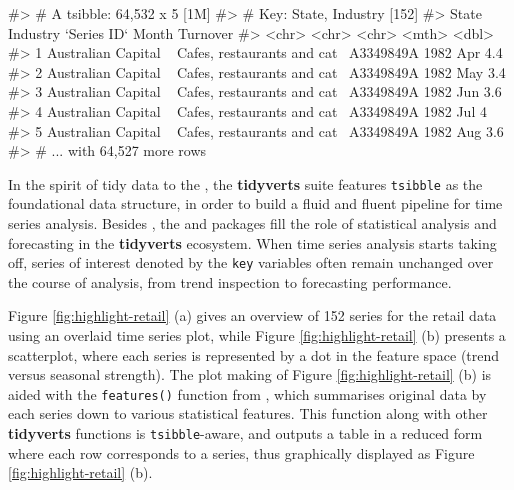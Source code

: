 \begin{Schunk}
\begin{Soutput}
#> # A tsibble: 64,532 x 5 [1M]
#> # Key:       State, Industry [152]
#>   State                Industry                    `Series ID`    Month Turnover
#>   <chr>                <chr>                       <chr>          <mth>    <dbl>
#> 1 Australian Capital ~ Cafes, restaurants and cat~ A3349849A   1982 Apr      4.4
#> 2 Australian Capital ~ Cafes, restaurants and cat~ A3349849A   1982 May      3.4
#> 3 Australian Capital ~ Cafes, restaurants and cat~ A3349849A   1982 Jun      3.6
#> 4 Australian Capital ~ Cafes, restaurants and cat~ A3349849A   1982 Jul      4  
#> 5 Australian Capital ~ Cafes, restaurants and cat~ A3349849A   1982 Aug      3.6
#> # ... with 64,527 more rows
\end{Soutput}
\end{Schunk}

In the spirit of tidy data to the 
\citep{Wickham2019}, the \textbf{tidyverts} suite features
\texttt{tsibble} as the foundational data structure, in order to build a
fluid and fluent pipeline for time series analysis. Besides
, the  and  packages
fill the role of statistical analysis and forecasting in the
\textbf{tidyverts} ecosystem. When time series analysis starts taking
off, series of interest denoted by the \texttt{key} variables often
remain unchanged over the course of analysis, from trend inspection to
forecasting performance.

Figure \ref{fig:highlight-retail} (a) gives an overview of 152 series
for the retail data using an overlaid time series plot, while Figure
\ref{fig:highlight-retail} (b) presents a scatterplot, where each series
is represented by a dot in the feature space (trend versus seasonal
strength). The plot making of Figure \ref{fig:highlight-retail} (b) is
aided with the \texttt{features()} function from , which
summarises original data by each series down to various statistical
features. This function along with other \textbf{tidyverts} functions is
\texttt{tsibble}-aware, and outputs a table in a reduced form where each
row corresponds to a series, thus graphically displayed as Figure
\ref{fig:highlight-retail} (b).

